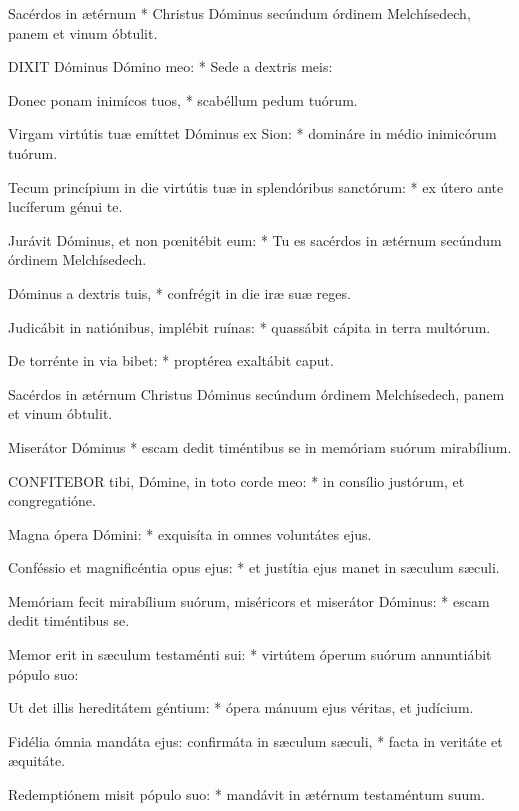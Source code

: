 

 Sacérdos in ætérnum * Christus Dóminus secúndum órdinem Melchísedech, panem et vinum óbtulit.


\lettrine[lines=2]{D}{IXIT} Dóminus Dómino meo: * Sede a dextris meis:

Donec ponam inimícos tuos, * scabéllum pedum tuórum.

Virgam virtútis tuæ emíttet Dóminus ex Sion: * domináre in médio inimicórum tuórum.

Tecum princípium in die virtútis tuæ in splendóribus sanctórum: * ex útero ante lucíferum génui te.

Jurávit Dóminus, et non pœnitébit eum: * Tu es sacérdos in ætérnum secúndum órdinem Melchísedech.

Dóminus a dextris tuis, * confrégit in die iræ suæ reges.

Judicábit in natiónibus, implébit ruínas: * quassábit cápita in terra multórum.

De torrénte in via bibet: * proptérea exaltábit caput.

 Sacérdos in ætérnum Christus Dóminus secúndum órdinem Melchísedech, panem et vinum óbtulit.

 Miserátor Dóminus * escam dedit timéntibus se in memóriam suórum mirabílium.


\lettrine[lines=2]{C}{ONFITEBOR} tibi, Dómine, in toto corde meo: * in consílio justórum, et congregatióne.

Magna ópera Dómini: * exquisíta in omnes voluntátes ejus.

Conféssio et magnificéntia opus ejus: * et justítia ejus manet in sæculum sæculi.

Memóriam fecit mirabílium suórum, miséricors et miserátor Dóminus: * escam dedit timéntibus se.

Memor erit in sæculum testaménti sui: * virtútem óperum suórum annuntiábit pópulo suo:

Ut det illis hereditátem géntium: * ópera mánuum ejus véritas, et judícium.

Fidélia ómnia mandáta ejus: confirmáta in sæculum sæculi, * facta in veritáte et æquitáte.

Redemptiónem misit pópulo suo: * mandávit in ætérnum testaméntum suum.

